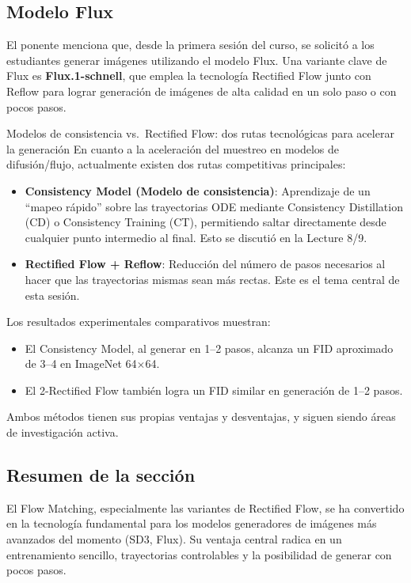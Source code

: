 \subsection{Modelo Flux}

El ponente menciona que, desde la primera sesión del curso, se solicitó a los estudiantes generar imágenes utilizando el modelo Flux. Una variante clave de Flux es \textbf{Flux.1-schnell}, que emplea la tecnología Rectified Flow junto con Reflow para lograr generación de imágenes de alta calidad en un solo paso o con pocos pasos.

\begin{knowledgebox}{Modelos de consistencia vs.\ Rectified Flow: dos rutas tecnológicas para acelerar la generación}
En cuanto a la aceleración del muestreo en modelos de difusión/flujo, actualmente existen dos rutas competitivas principales:
\begin{itemize}
    \item \textbf{Consistency Model (Modelo de consistencia)}: Aprendizaje de un ``mapeo rápido'' sobre las trayectorias ODE mediante Consistency Distillation (CD) o Consistency Training (CT), permitiendo saltar directamente desde cualquier punto intermedio al final. Esto se discutió en la Lecture 8/9.
    \item \textbf{Rectified Flow + Reflow}: Reducción del número de pasos necesarios al hacer que las trayectorias mismas sean más rectas. Este es el tema central de esta sesión.
\end{itemize}

Los resultados experimentales comparativos muestran:
\begin{itemize}
    \item El Consistency Model, al generar en 1--2 pasos, alcanza un FID aproximado de 3--4 en ImageNet 64$\times$64.
    \item El 2-Rectified Flow también logra un FID similar en generación de 1--2 pasos.
\end{itemize}
Ambos métodos tienen sus propias ventajas y desventajas, y siguen siendo áreas de investigación activa.
\end{knowledgebox}

\subsection{Resumen de la sección}

El Flow Matching, especialmente las variantes de Rectified Flow, se ha convertido en la tecnología fundamental para los modelos generadores de imágenes más avanzados del momento (SD3, Flux). Su ventaja central radica en un entrenamiento sencillo, trayectorias controlables y la posibilidad de generar con pocos pasos.


